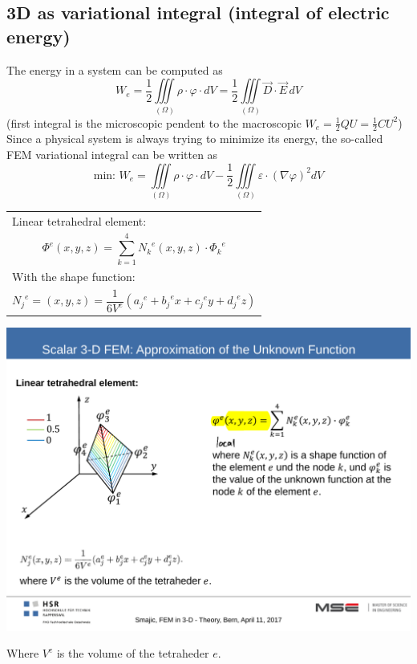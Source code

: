 \subsection{3D as variational integral (integral of electric energy)}
The energy in a system can be computed as
\begin{equation*}
	W_e = \frac{1}{2} \iiint\limits_{\left(\Omega\right)} \rho \cdot \varphi \cdot dV = \frac{1}{2} \iiint\limits_{\left(\Omega	\right)} \vec{D} \cdot \vec{E}\,dV
\end{equation*}
(first integral is the microscopic pendent to the macroscopic $W_e = \frac{1}{2} QU = \frac{1}{2}CU^2$) \newline
Since a physical system is always trying to minimize its energy, the so-called FEM variational integral can be written as
\begin{equation*}
	\textrm{min: } W_e = \iiint\limits_{\left(\Omega\right)} \rho \cdot \varphi \cdot dV - \frac{1}{2} \iiint\limits_{\left(\Omega\right)} \varepsilon \cdot \left(\nabla \varphi\right)^2 dV
\end{equation*}

\begin{minipage}[rt]{12cm}
	\begin{tabular}{l}
		Linear tetrahedral element: \\
		\begin{equation*}
			\Phi^e(x,y,z) = \sum_{k=1}^{4}{N_k}^e(x,y,z) \cdot {\Phi_k}^e
		\end{equation*} \\
		With the shape function: \\
		\begin{equation*}
			{N_j}^e = (x,y,z) = \frac{1}{6 V^e}\left({a_j}^e + {b_j}^e x + {c_j}^e y + {d_j}^e z\right)
		\end{equation*}
	\end{tabular}
\end{minipage}
\begin{minipage}[lt]{8cm}
	\includegraphics[width=.6\textwidth]{./images/tetraheder.pdf}\\
\end{minipage}
Where $V^e$ is the volume of the tetraheder $e$.
